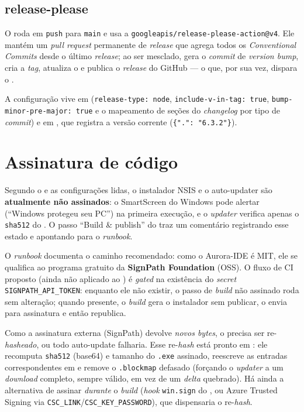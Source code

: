 \subsection{release-please}

O  roda em \texttt{push} para
\texttt{main} e usa a \lstinline|googleapis/release-please-action@v4|. Ele mantém
um \emph{pull request} permanente de \emph{release} que agrega todos os
\emph{Conventional Commits} desde o último \emph{release}; ao ser mesclado, gera
o \emph{commit} de \emph{version bump}, cria a \emph{tag}, atualiza o
 e publica o \emph{release} do GitHub --- o que, por sua vez,
dispara o .

A configuração vive em 
(\lstinline|release-type: node|, \lstinline|include-v-in-tag: true|,
\lstinline|bump-minor-pre-major: true| e o mapeamento de seções do
\emph{changelog} por tipo de \emph{commit}) e em
, que registra a versão corrente
(\lstinline|{".": "6.3.2"}|).

\section{Assinatura de código}
\label{sec:16-signing}

Segundo o  e as configurações lidas, o instalador
NSIS e o auto-updater são \textbf{atualmente não assinados}: o SmartScreen do
Windows pode alertar (\enquote{Windows protegeu seu PC}) na primeira execução, e
o \emph{updater} verifica apenas o \texttt{sha512} do . O passo
\enquote{Build \& publish} do  traz um comentário registrando
esse estado e apontando para o \emph{runbook}.

O \emph{runbook} documenta o caminho recomendado: como o Aurora-IDE é MIT, ele se
qualifica ao programa gratuito da \textbf{SignPath Foundation} (OSS). O fluxo de
CI proposto (ainda não aplicado ao ) é \emph{gated} na
existência do \emph{secret} \texttt{SIGNPATH\_API\_TOKEN}: enquanto ele não
existir, o passo de \emph{build} não assinado roda sem alteração; quando
presente, o \emph{build} gera o instalador sem publicar, o envia para assinatura
e então republica.

Como a assinatura externa (SignPath) devolve \emph{novos bytes}, o
 precisa ser re-\emph{hasheado}, ou todo auto-update falharia.
Esse re-\emph{hash} está pronto em : ele
recomputa \texttt{sha512} (base64) e tamanho do \texttt{.exe} assinado, reescreve
as entradas correspondentes em  e remove o \texttt{.blockmap}
defasado (forçando o \emph{updater} a um \emph{download} completo, sempre válido,
em vez de um \emph{delta} quebrado). Há ainda a alternativa de assinar
\emph{durante} o \emph{build} (\emph{hook} \lstinline|win.sign| do
, ou Azure Trusted Signing via
\texttt{CSC\_LINK}/\texttt{CSC\_KEY\_PASSWORD}), que dispensaria o re-\emph{hash}.

